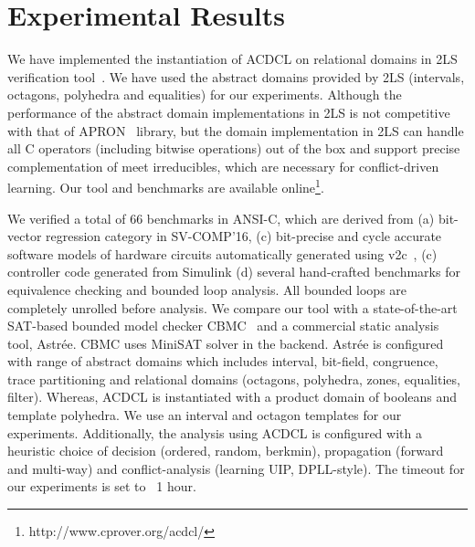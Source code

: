\section{Experimental Results}
We have implemented the instantiation of ACDCL on relational domains
in 2LS verification tool~\cite{2ls}.  We have used the abstract domains
provided by 2LS (intervals, octagons, polyhedra and equalities) for our
experiments. Although the performance of the abstract domain implementations 
in 2LS is not competitive with that of APRON~\cite{apron} library, but 
the domain implementation in 2LS can handle all C operators 
(including bitwise operations) out of the box and support precise
complementation of meet irreducibles, which are necessary for conflict-driven 
learning. Our tool and benchmarks are available online\footnote{http://www.cprover.org/acdcl/}.

We verified a total of 66 benchmarks in ANSI-C, which are derived from 
(a) bit-vector regression category in SV-COMP'16, (c) bit-precise and 
cycle accurate software models of hardware circuits automatically 
generated using v2c~\cite{mtk2016}, (c) controller code generated 
from Simulink (d) several hand-crafted benchmarks for equivalence 
checking and bounded loop analysis.  All bounded loops are completely 
unrolled before analysis.  We compare our tool with a state-of-the-art 
SAT-based bounded model checker CBMC~\cite{cbmc} and a commercial 
static analysis tool, Astr{\'e}e.  CBMC uses MiniSAT solver in the backend.  
Astr{\'e}e is configured with range of abstract domains which includes 
interval, bit-field, congruence, trace partitioning and relational 
domains (octagons, polyhedra, zones, equalities, filter).  Whereas, 
ACDCL is instantiated with a product domain of booleans and template 
polyhedra.  We use an interval and octagon templates for our
experiments.  Additionally, the analysis using ACDCL is configured with 
a heuristic choice of decision (ordered, random, berkmin), 
propagation (forward and multi-way) and conflict-analysis (learning UIP,
DPLL-style).  The timeout for our experiments is set to ~1 hour. 
%
